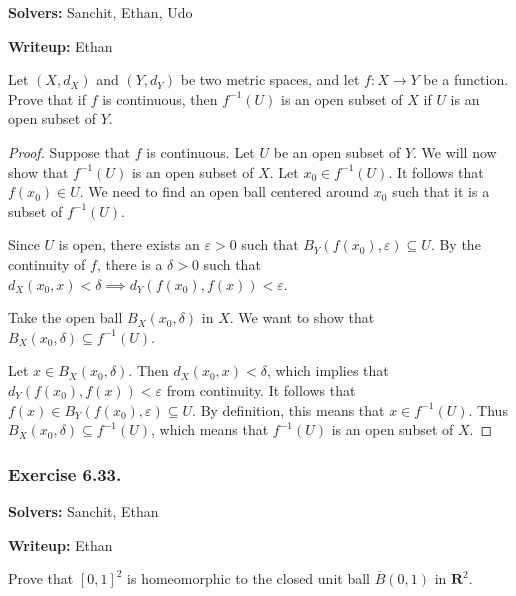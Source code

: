 \documentclass{article}
\newcommand{\R}{\mathbf{R}}
\newcommand{\cl}[1]{\overline{#1}}
\theoremstyle{plain} %
\numberwithin{thm}{section} %
\theoremstyle{definition}
\begin{document}
    \noindent\textbf{Solvers:} Sanchit, Ethan, Udo
    
    \noindent\textbf{Writeup:} Ethan

    Let $(X,d_X)$ and $(Y,d_Y)$ be two metric spaces, and let $f:X\rightarrow Y$ be a function. Prove that if \(f\) is continuous, then $f^{-1}(U)$ is an open subset of $X$ if $U$ is an open subset of $Y$.

    \begin{proof}
        Suppose that \(f\) is continuous. Let \(U\) be an open subset of \(Y\). We will now show that \(f^{-1} (U)\) is an open subset of \(X\). Let \(x_0 \in f^{-1} (U)\). It follows that \(f(x_0) \in U\). We need to find an open ball centered around \(x_0\) such that it is a subset of \(f^{-1} (U)\).
        
        Since \(U\) is open, there exists an \(\varepsilon > 0\) such that \(B_Y(f(x_0), \varepsilon) \subseteq U\). By the continuity of \(f\), there is a \(\delta > 0\) such that \(d_X (x_0, x) < \delta \implies d_Y (f(x_0), f(x)) < \varepsilon\).
        
        Take the open ball \(B_X(x_0, \delta)\) in \(X\). We want to show that \(B_X (x_0, \delta) \subseteq f^{-1} (U)\).

        Let \(x \in B_X (x_0, \delta)\). Then \(d_X(x_0, x) < \delta\), which implies that \(d_Y (f(x_0), f(x)) < \varepsilon\) from continuity. It follows that \(f(x) \in B_Y (f(x_0), \varepsilon) \subseteq U\). By definition, this means that \(x \in f^{-1} (U)\). Thus \(B_X (x_0, \delta) \subseteq f^{-1} (U)\), which means that \(f^{-1} (U)\) is an open subset of \(X\).

    \end{proof}

    \subsubsection{Exercise 6.33.}

    \noindent\textbf{Solvers:} Sanchit, Ethan
    
    \noindent\textbf{Writeup:} Ethan

    Prove that $[0,1]^2$ is homeomorphic to the closed unit ball $\cl{B}(0,1)$ in $\R^2$.
\end{document}
